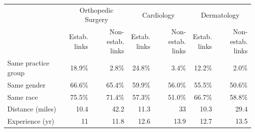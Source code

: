 \begin{tabular}{lrrrrrr}
\toprule
\multicolumn{1}{c}{ } & \multicolumn{2}{c}{Orthopedic Surgery} & \multicolumn{2}{c}{Cardiology} & \multicolumn{2}{c}{Dermatology} \\
\cmidrule(l{3pt}r{3pt}){2-3} \cmidrule(l{3pt}r{3pt}){4-5} \cmidrule(l{3pt}r{3pt}){6-7}
 & \shortstack[r]{Estab.\\links} & \shortstack[r]{Non-estab.\\links} & \shortstack[r]{Estab.\\links} & \shortstack[r]{Non-estab.\\links} & \shortstack[r]{Estab.\\links} & \shortstack[r]{Non-estab.\\links}\\
\midrule
Same practice group & 18.9\% & 2.8\% & 24.8\% & 3.4\% & 12.2\% & 2.0\%\\
Same gender & 66.6\% & 65.4\% & 59.9\% & 56.0\% & 55.5\% & 50.6\%\\
Same race & 75.5\% & 71.4\% & 57.3\% & 51.0\% & 66.7\% & 58.8\%\\
Distance (miles) & 10.4 & 42.2 & 11.3 & 33 & 10.3 & 29.4\\
Experience (yr) & 11 & 11.8 & 12.6 & 13.9 & 12.7 & 13.5\\
\bottomrule
\end{tabular}
